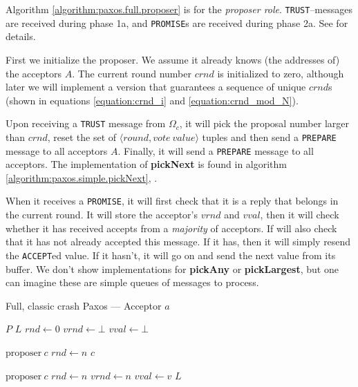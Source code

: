 Algorithm \ref{algorithm:paxos.full.proposer}
 is for the \textit{proposer
role}.  \texttt{TRUST}--messages are received during phase 1a, and
\texttt{PROMISE}s are received during phase 2a. See \cite{Lam01} for details.

First we initialize the proposer. We assume it already knows (the addresses
of) the acceptors $A$.  The current round number $crnd$ is initialized to
zero, although later we will implement a version that guarantees a sequence
of unique $crnd$s (shown in equations \ref{equation:crnd_i} and
\ref{equation:crnd_mod_N}).

Upon receiving a \texttt{TRUST} message from $\Omega_c$, it will pick the
proposal number larger than $crnd$, reset the set of
$\langle round, vote~value\rangle$ tuples and then send a
\texttt{PREPARE} message to all acceptors $A$.  Finally, it will
send a \texttt{PREPARE} message to all acceptors.
%
The implementation of \textbf{pickNext} is found in
algorithm \ref{algorithm:paxos.simple.pickNext},
.

When it receives a \texttt{PROMISE}, it will first check that it is a reply
that belongs in the current round.  It will store the acceptor's $vrnd$ and
$vval$, then it will check whether it has received accepts from a
\textit{majority} of acceptors.
If will also check that it has not already accepted this message.
If it has, then it will simply resend the \texttt{ACCEPT}ed value.
If it hasn't, it will go on and send the next value from its buffer.
We don't show implementations for \textbf{pickAny} or \textbf{pickLargest},
but one can imagine these are simple queues of messages to process.

\begin{algorithm}[H]
  \caption{Full, classic crash Paxos --- Acceptor $a$}
  \label{algorithm:paxos.full.acceptor}
  \begin{algorithmic}
    \State $P$ 
    \State $L$ 
    \State $rnd \gets 0$ 
    \State $vrnd \gets \bot$ 
    \State $vval \gets \bot$ 
    \State

       {$\text{proposer}\ c$} 
         \State $rnd \gets n$
         \State {}
                       {$c$}
      \EndIf
    \EndOn
    \State

       {$\text{proposer}\ c$} 
        \State $rnd \gets n$
        \State $vrnd \gets n$
        \State $vval \gets v$
        \State {}
                      {$L$}
      \EndIf
    \EndOn
  \end{algorithmic}
\end{algorithm}

